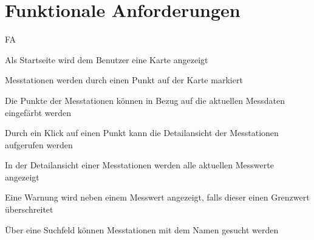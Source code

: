 \section{Funktionale Anforderungen}

\setcounter{counter}{10}
\begin{Kriterien}{FA}
    \item Als Startseite wird dem Benutzer eine Karte angezeigt
    \item Messtationen werden durch einen Punkt auf der Karte markiert
    \item Die Punkte der Messtationen können in Bezug auf die aktuellen Messdaten eingefärbt werden
    \item Durch ein Klick auf einen Punkt kann die Detailansicht der Messtationen aufgerufen werden
    \item In der Detailansicht einer Messtationen werden alle aktuellen Messwerte angezeigt
    \item Eine Warnung wird neben einem Messwert angezeigt, falls dieser einen Grenzwert überschreitet
    \item Über eine Suchfeld können Messtationen mit dem Namen gesucht werden
\end{Kriterien}